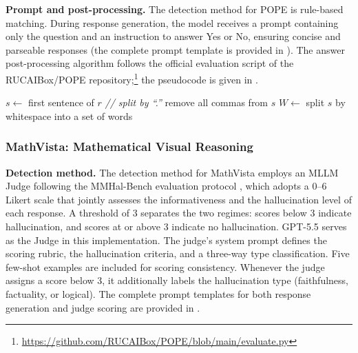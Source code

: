 \textbf{Prompt and post-processing.}
The detection method for POPE is rule-based matching.
During response generation,
the model receives a prompt containing only the question
and an instruction to answer Yes or No,
ensuring concise and parseable responses
(the complete prompt template is provided in ).
The answer post-processing algorithm follows
the official evaluation script of the
RUCAIBox/POPE repository;\footnote{\url{https://github.com/RUCAIBox/POPE/blob/main/evaluate.py}}
the pseudocode is given in .

\begin{algorithm}[htbp]
  \caption{POPE answer normalization}
  \label{alg:pope_normalize}
  \begin{algorithmic}[1]
    \State $s \gets$ first sentence of $r$ \hfill \textit{// split by ``.''}
    \State remove all commas from $s$
    \State $W \gets$ split $s$ by whitespace into a set of words
      \State \Return {}
    \EndIf
    \State \Return {}
  \end{algorithmic}
\end{algorithm}

\subsubsection{MathVista: Mathematical Visual Reasoning}

\textbf{Detection method.}
The detection method for MathVista employs an MLLM Judge
following the MMHal-Bench evaluation protocol
\citep{sunAligningLargeMultimodal2023},
which adopts a 0--6 Likert scale
that jointly assesses the informativeness
and the hallucination level of each response.
A threshold of 3 separates the two regimes:
scores below 3 indicate hallucination,
and scores at or above 3 indicate no hallucination.
GPT-5.5 serves as the Judge in this implementation.
The judge's system prompt defines the scoring rubric,
the hallucination criteria,
and a three-way type classification.
Five few-shot examples are included for scoring consistency.
Whenever the judge assigns a score below 3,
it additionally labels the hallucination type
(faithfulness, factuality, or logical).
The complete prompt templates for both response generation
and judge scoring are provided in .

